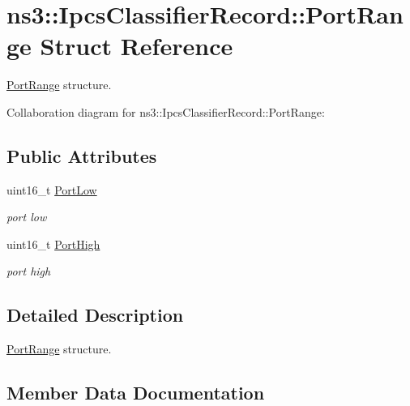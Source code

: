 \hypertarget{structns3_1_1IpcsClassifierRecord_1_1PortRange}{}\section{ns3\+:\+:Ipcs\+Classifier\+Record\+:\+:Port\+Range Struct Reference}
\label{structns3_1_1IpcsClassifierRecord_1_1PortRange}


\hyperlink{structns3_1_1IpcsClassifierRecord_1_1PortRange}{Port\+Range} structure.  




Collaboration diagram for ns3\+:\+:Ipcs\+Classifier\+Record\+:\+:Port\+Range\+:
\subsection*{Public Attributes}
\begin{DoxyCompactItemize}
\item 
uint16\+\_\+t \hyperlink{structns3_1_1IpcsClassifierRecord_1_1PortRange_ac8b4597f55837bf2c713adb4944d2ce2}{Port\+Low}
\begin{DoxyCompactList}\small\item\em port low \end{DoxyCompactList}\item 
uint16\+\_\+t \hyperlink{structns3_1_1IpcsClassifierRecord_1_1PortRange_ae9059d318445aaaa1476ac86f8795381}{Port\+High}
\begin{DoxyCompactList}\small\item\em port high \end{DoxyCompactList}\end{DoxyCompactItemize}


\subsection{Detailed Description}
\hyperlink{structns3_1_1IpcsClassifierRecord_1_1PortRange}{Port\+Range} structure. 

\subsection{Member Data Documentation}
